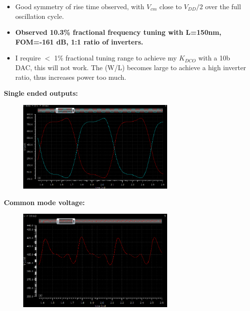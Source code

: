 			\begin{itemize}[itemsep=4pt,label=\protect---]
				\item Good symmetry of rise time observed, with $V_{cm}$ close to $V_{DD}/2$ over the full oscillation cycle.
				\item \textbf{Observed 10.3\% fractional frequency tuning with L=150nm, FOM=-161 dB, 1:1 ratio of inverters.}
				\item I require $<$ 1\% fractional tuning range to achieve my $K_{DCO}$ with a 10b DAC, this will not work. The (W/L) becomes large to achieve a high inverter ratio, thus increases power too much.
			\end{itemize}

			\hspace{1em}\textbf{Single ended outputs:}
			\vspace{-1em}
			\begin{figure}[htb!]
			        \centering
			        \includegraphics[width=0.7\textwidth, angle=0]{./figs/parallel_osc_wfm}
			\end{figure}
			\vspace{-1em}
			\hspace{1em}\textbf{Common mode voltage:}
			\vspace{-1em}
			\begin{figure}[htb!]
			        \centering
			        \includegraphics[width=0.7\textwidth, angle=0]{./figs/parallel_cmv}
			\end{figure}


